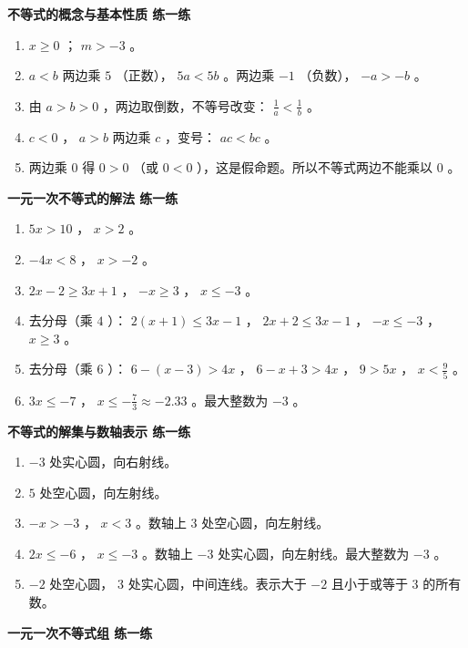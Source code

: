 \begin{answer}


\textbf{不等式的概念与基本性质 练一练}

\begin{enumerate}
  \item $x \geq 0$ ； $m > -3$ 。
  \item $a < b$ 两边乘 $5$ （正数）， $5a < 5b$ 。两边乘 $-1$ （负数）， $-a > -b$ 。
  \item 由 $a > b > 0$ ，两边取倒数，不等号改变： $\frac{1}{a} < \frac{1}{b}$ 。
  \item $c < 0$ ， $a > b$ 两边乘 $c$ ，变号： $ac < bc$ 。
  \item 两边乘 $0$ 得 $0 > 0$ （或 $0 < 0$ ），这是假命题。所以不等式两边不能乘以 $0$ 。
\end{enumerate}


\textbf{一元一次不等式的解法 练一练}

\begin{enumerate}
  \item $5x > 10$ ， $x > 2$ 。
  \item $-4x < 8$ ， $x > -2$ 。
  \item $2x - 2 \geq 3x + 1$ ， $-x \geq 3$ ， $x \leq -3$ 。
  \item 去分母（乘 $4$ ）： $2(x + 1) \leq 3x - 1$ ， $2x + 2 \leq 3x - 1$ ， $-x \leq -3$ ， $x \geq 3$ 。
  \item 去分母（乘 $6$ ）： $6 - (x - 3) > 4x$ ， $6 - x + 3 > 4x$ ， $9 > 5x$ ， $x < \frac{9}{5}$ 。
  \item $3x \leq -7$ ， $x \leq -\frac{7}{3} \approx -2.33$ 。最大整数为 $-3$ 。
\end{enumerate}


\textbf{不等式的解集与数轴表示 练一练}

\begin{enumerate}
  \item $-3$ 处实心圆，向右射线。
  \item $5$ 处空心圆，向左射线。
  \item $-x > -3$ ， $x < 3$ 。数轴上 $3$ 处空心圆，向左射线。
  \item $2x \leq -6$ ， $x \leq -3$ 。数轴上 $-3$ 处实心圆，向左射线。最大整数为 $-3$ 。
  \item $-2$ 处空心圆， $3$ 处实心圆，中间连线。表示大于 $-2$ 且小于或等于 $3$ 的所有数。
\end{enumerate}


\textbf{一元一次不等式组 练一练}


\end{answer}
